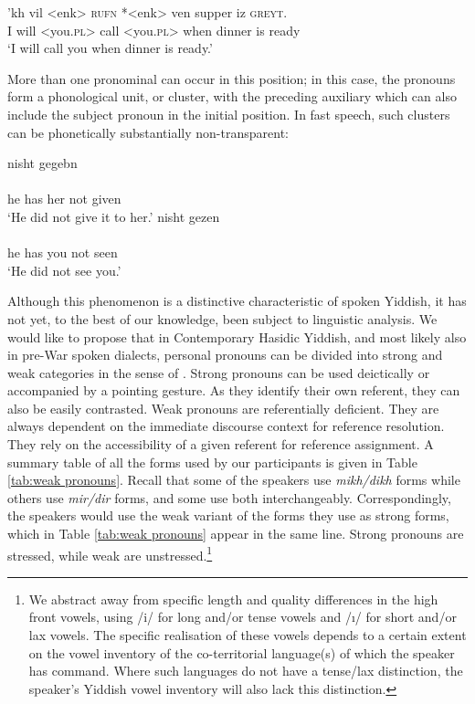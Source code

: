 \documentclass[output=paper, hidelinks]{langscibook}
\begin{document}
\ea\label{ex:1} \gll 'kh vil <enk> \textsc{rufn} *<enk> ven supper iz \textsc{greyt}.\footnotemark\\
I will <you.\textsc{pl}> call <you.\textsc{pl}> when dinner is ready\\
\glt `I will call you when dinner is ready.'
\z


More than one pronominal can occur in this position; in this case, the pronouns form a phonological unit, or cluster, with the preceding auxiliary which can also include the subject pronoun in the initial position. In fast speech, such clusters can be phonetically substantially non-transparent:

\ea \ea {} nisht gegebn\\
[ɛtәsi] {} {}\\
{he has her} not given\\
\glt `He did not give it to her.'
\ex {} nisht gezen\\
[ɛdәχ] {} {}\\
{he has you} not seen\\
\glt `He did not see you.'
\z
\z

Although this phenomenon is a distinctive characteristic of spoken Yiddish, it has not yet, to the best of our knowledge, been subject to linguistic analysis. We would like to propose that in Contemporary Hasidic Yiddish, and most likely also in pre-War spoken dialects, personal pronouns can be divided into strong and weak categories in the sense of \citet{Cardinaletti99}. Strong pronouns can be used deictically or accompanied by a pointing gesture. As they identify their own referent, they can also be easily contrasted. Weak pronouns are referentially deficient. They are always dependent on the immediate discourse context for reference resolution. They rely on the accessibility of a given referent for reference assignment. A summary table of all the forms used by our participants is given in Table \ref{tab:weak pronouns}. Recall that some of the speakers use \textit{mikh/dikh} forms while others use \textit{mir/dir} forms, and some use both interchangeably. Correspondingly, the speakers would use the weak variant of the forms they use as strong forms, which in Table \ref{tab:weak pronouns} appear in the same line. Strong pronouns are stressed, while weak are unstressed.\footnote{We abstract away from specific length and quality differences in the high front vowels, using /i/ for long and/or tense vowels and /ı/ for short and/or lax vowels. The specific realisation of these vowels depends to a certain extent on the vowel inventory of the co-territorial language(s) of which the speaker has command. Where such languages do not have a tense/lax distinction, the speaker's Yiddish vowel inventory will also lack this distinction.}
\end{document}
